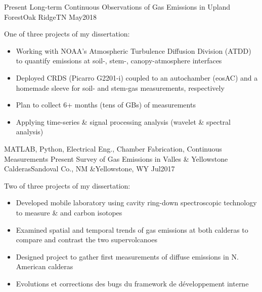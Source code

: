 %
%
%
\begin{experiences}
  \experience
    {Present}       {Long-term Continuous Observations of Gas Emissions in Upland Forest}{Oak Ridge}{TN}
    {May2018}      {
                    One of three projects of my dissertation:
                      \begin{itemize}
                        \item Working with NOAA’s Atmospheric Turbulence Diffusion Division (ATDD) to quantify  emissions at soil-, stem-, canopy-atmosphere interfaces                        
                        \item Deployed CRDS (Picarro G2201-i) coupled to an autochamber (eosAC) and a homemade sleeve for soil- and stem-gas measurements, respectively
                        \item Plan to collect 6+ months (tens of GBs) of measurements               
                        \item Applying time-series \& signal processing analysis (wavelet \& spectral analysis)     
                      \end{itemize}
                    }
                    {MATLAB, Python, Electrical Eng., Chamber Fabrication, Continuous Measurements}
  \emptySeparator
  \experience
    {Present}       {Survey of Gas Emissions in Valles \& Yellowstone Calderas}{Sandoval Co., NM \&}{Yellowstone, WY}
    {Jul2017}      {
                    Two of three projects of my dissertation:
                      \begin{itemize}
                        \item Developed mobile laboratory using cavity ring-down spectroscopic technology to measure  \&  and carbon isotopes
                        \item Examined spatial and temporal trends of gas emissions at both calderas to compare and contrast the two supervolcanoes      
                        \item Designed project to gather first measurements of diffuse  emissions in N. American calderas 
                        \item Evolutions et corrections des bugs du framework de développement interne                

\end{itemize}}
\end{experiences}

